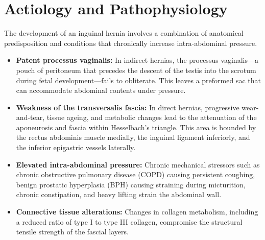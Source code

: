 \section*{Aetiology and Pathophysiology}
The development of an inguinal hernia involves a combination of anatomical predisposition and conditions that chronically increase intra-abdominal pressure.
\begin{itemize}
    \item \textbf{Patent processus vaginalis:} In indirect hernias, the processus vaginalis—a pouch of peritoneum that precedes the descent of the testis into the scrotum during fetal development—fails to obliterate. This leaves a preformed sac that can accommodate abdominal contents under pressure.
    \item \textbf{Weakness of the transversalis fascia:} In direct hernias, progressive wear-and-tear, tissue ageing, and metabolic changes lead to the attenuation of the aponeurosis and fascia within Hesselbach's triangle. This area is bounded by the rectus abdominis muscle medially, the inguinal ligament inferiorly, and the inferior epigastric vessels laterally.
    \item \textbf{Elevated intra-abdominal pressure:} Chronic mechanical stressors such as chronic obstructive pulmonary disease (COPD) causing persistent coughing, benign prostatic hyperplasia (BPH) causing straining during micturition, chronic constipation, and heavy lifting strain the abdominal wall.
    \item \textbf{Connective tissue alterations:} Changes in collagen metabolism, including a reduced ratio of type I to type III collagen, compromise the structural tensile strength of the fascial layers.
\end{itemize}

